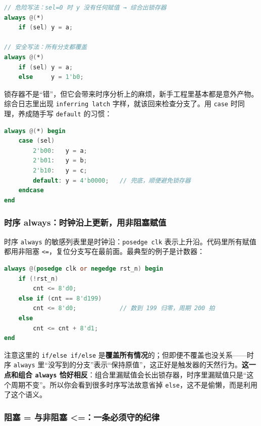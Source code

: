 \begin{lstlisting}[language=Verilog,numbers=none]
// 危险写法：sel=0 时 y 没有任何赋值 → 综合出锁存器
always @(*)
    if (sel) y = a;

// 安全写法：所有分支都覆盖
always @(*)
    if (sel) y = a;
    else     y = 1'b0;
\end{lstlisting}

锁存器不是“错”，但它会带来时序分析上的麻烦，新手工程里基本都是意外产物。综合日志里出现 \texttt{inferring latch} 字样，就该回来检查分支了。用 \texttt{case} 时同理，养成随手写 \texttt{default} 的习惯：

\begin{lstlisting}[language=Verilog,numbers=none]
always @(*) begin
    case (sel)
        2'b00:   y = a;
        2'b01:   y = b;
        2'b10:   y = c;
        default: y = 4'b0000;   // 兜底，顺便避免锁存器
    endcase
end
\end{lstlisting}


\subsubsection*{时序 always：时钟沿上更新，用非阻塞赋值}

时序 \texttt{always} 的敏感列表里是时钟沿：\texttt{posedge clk} 表示上升沿。代码里所有赋值都用非阻塞 \texttt{<=}，复位分支写在最前面。最典型的例子是计数器：

\begin{lstlisting}[language=Verilog,numbers=none]
always @(posedge clk or negedge rst_n) begin
    if (!rst_n)
        cnt <= 8'd0;
    else if (cnt == 8'd199)
        cnt <= 8'd0;            // 数到 199 归零，周期 200 拍
    else
        cnt <= cnt + 8'd1;
end
\end{lstlisting}

注意这里的 \texttt{if/else if/else} 是\textbf{覆盖所有情况}的；但即便不覆盖也没关系——时序 \texttt{always} 里“没写到的分支”表示“保持原值”，这正好是触发器的天然行为。\textbf{这一点和组合 \texttt{always} 恰好相反}：组合里漏赋值会长出锁存器，时序里漏赋值只是“这个周期不变”。所以你会看到很多时序写法故意省掉 \texttt{else}，这不是偷懒，而是利用了这个语义。

\subsubsection*{阻塞 = 与非阻塞 <=：一条必须守的纪律}

